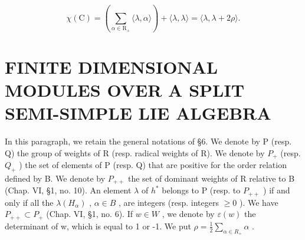 \[
\chi (\mathrm{C}) = \left(\sum_ {\alpha \in \mathrm{R} _ {+}} \langle \lambda , \alpha \rangle\right) + \langle \lambda , \lambda \rangle = \langle \lambda , \lambda + 2 \rho \rangle .
\]

\section{FINITE DIMENSIONAL MODULES OVER A SPLIT SEMI-SIMPLE LIE ALGEBRA}

In this paragraph, we retain the general notations of §6. We denote by P (resp. Q) the group of weights of R (resp. radical weights of R). We denote by \(P_{+}\) (resp. \(Q_{+}\) ) the set of elements of P (resp. Q) that are positive for the order relation defined by B. We denote by \(P_{++}\) the set of dominant weights of R relative to B (Chap. VI, §1, no. 10). An element \(\lambda\) of \(h^{*}\) belongs to P (resp. to \(P_{++}\) ) if and only if all the \(\lambda(H_{\alpha})\) , \(\alpha \in B\) , are integers (resp. integers \(\geq 0\) ). We have \(P_{++} \subset P_{+}\) (Chap. VI, §1, no. 6). If \(w \in W\) , we denote by \(\varepsilon(w)\) the determinant of w, which is equal to 1 or -1. We put \(\rho = \frac{1}{2} \sum_{\alpha \in R_{+}} \alpha\) .
